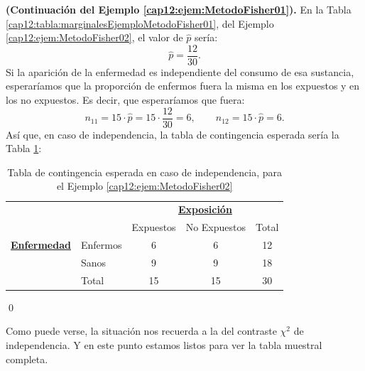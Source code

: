 \begin{ejemplo}
\label{cap12:ejem:MetodoFisher02}
{\bf (Continuación del Ejemplo \ref{cap12:ejem:MetodoFisher01}).}
En la Tabla \ref{cap12:tabla:marginalesEjemploMetodoFisher01}, del Ejemplo \ref{cap12:ejem:MetodoFisher02}, el valor de $\hat p$ sería:
\[\hat p=\dfrac{12}{30}.\]
Si la aparición de la enfermedad es independiente del consumo de esa sustancia, esperaríamos que la proporción de enfermos fuera la misma en los expuestos y en los no expuestos. Es decir, que esperaríamos que fuera:
\[
n_{11}=15\cdot{\hat p}=15\cdot{\dfrac{12}{30}}=6,\qquad n_{12}=15\cdot{\hat p}=6.
\]
Así que, en caso de independencia, la tabla de contingencia esperada sería la Tabla \ref{cap12:tabla:marginalesEjemploMetodoFisher02}:
        \begin{table}[h!]
        \begin{center}
            \begin{tabular}{llccc}
            &&\multicolumn{3}{c}{\underline{\bf Exposición}}\\

                                      &          & Expuestos &  No Expuestos& Total\\
            \cline{2-5}
          \underline{\bf Enfermedad} & Enfermos & 6&  6&   12\\
                                      & Sanos &   9& 9&  18\\
            \cline{2-5}
                                      & Total    & 15& 15& 30\\
            \cline{2-5}
            \end{tabular}
        \end{center}
        \caption{Tabla de contingencia esperada en caso de independencia, para el Ejemplo \ref{cap12:ejem:MetodoFisher02}}
        \label{cap12:tabla:marginalesEjemploMetodoFisher02}
        \end{table}
\qed
\end{ejemplo}
Como puede verse, la situación nos recuerda a la del contraste $\chi^2$ de independencia.  Y en este punto estamos listos para ver la tabla muestral completa.

